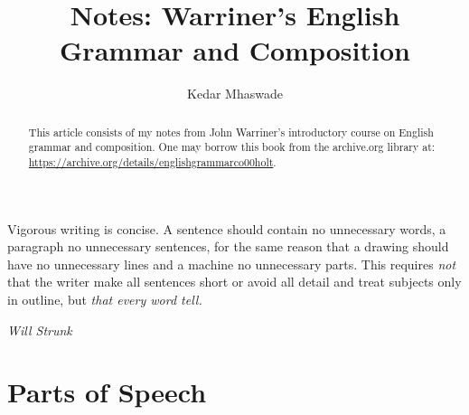 \documentclass[12pt]{article}         %
\title{Notes: Warriner's English Grammar and Composition}
\author{Kedar Mhaswade}
\begin{document}
\tableofcontents

\maketitle

\begin{abstract}
    This article consists of my notes from John Warriner's introductory course on English grammar and composition. One may borrow this book from the archive.org library at: \url{https://archive.org/details/englishgrammarco00holt}.
\end{abstract}
\renewcommand{\epigraphsize}{\small}
\setlength{\epigraphwidth}{0.8\textwidth}
\epigraph
{
    Vigorous writing is concise. A sentence should contain no unnecessary words, a paragraph no unnecessary sentences, for the same reason that a drawing should have no unnecessary lines and a machine no unnecessary parts. This requires \textit{not} that the writer make all sentences short or avoid all detail and treat subjects only in outline, but \textit{that every word tell.}
}
{\textit{Will Strunk}}
\sectionfont{\MakeUppercase}
\section{Parts of Speech}
\subsectionfont{\MakeUppercase}
\end{document}
